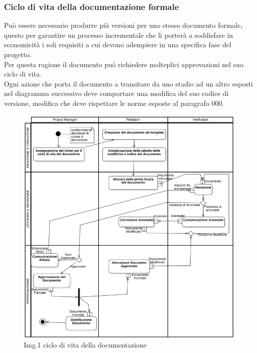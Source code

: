 		\subsubsection{Ciclo di vita della documentazione formale}
			Può essere necessario produrre più versioni per uno stesso documento formale, questo per garantire un processo incrementale che li porterà a soddisfare in economicità i soli requisiti a cui devono adempiere in una specifica fase del progetto.\\
			Per questa ragione il documento può richiedere molteplici approvazioni nel suo ciclo di vita.\\
			Ogni azione che porta il documento a transitare da uno stadio ad un altro esposti nel diagramma successivo deve comportare una modifica del suo codice di versione, modifica che deve rispettare le norme esposte al paragrafo 000.\\
			\begin{figure}[H]
    				\centering
    				\includegraphics[width=1.0\textwidth]{res/images/ciclo_di_vita.png}
				\caption{Img.1 ciclo di vita della documentazione}
				\label{fig:Img.1 ciclo di vita della documentazione}
			\end{figure}
